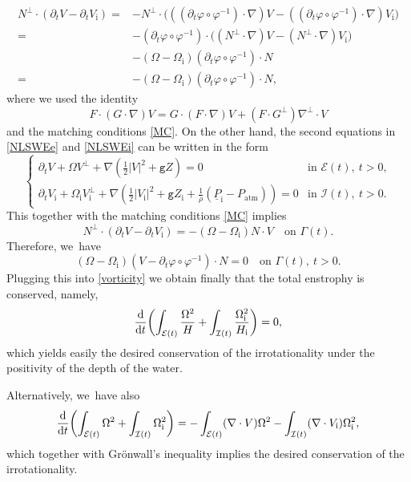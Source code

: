 \documentclass[JEP,XML,SOM,Unicode,NoFloatCountersInSection,published]{cedram}
\newcommand{\gr}{{\mathtt g}}
\newcommand{\dt}{\partial_t}
\newcommand{\cI}{{\mathcal I}}
\newcommand{\cE}{{\mathcal E}}
\newcommand{\ul}[1]{\underline{#1}}
\newcommand{\itGamma}{\mathit{\Gamma}}
\theoremstyle{definition}
\begin{document}
\begin{align*}
N^\perp\cdot(\dt V - \dt V_\mathrm{i})
=& -N^\perp\cdot\bigl(((\dt\varphi \circ \varphi^{-1})\cdot\nabla)V
- ((\dt\varphi \circ \varphi^{-1})\cdot\nabla)V_\mathrm{i} \bigr) \\
=& -(\dt\varphi \circ \varphi^{-1})\cdot\bigl((N^\perp\cdot\nabla)V - (N^\perp\cdot\nabla)V_\mathrm{i} \bigr)\\
& - (\Omega - \Omega_\mathrm{i})(\dt\varphi \circ \varphi^{-1}) \cdot N \\
=& - (\Omega - \Omega_\mathrm{i})(\dt\varphi \circ \varphi^{-1}) \cdot N,
\end{align*}
where we used the identity
\begin{equation}\label{F1}
F \cdot (G\cdot\nabla)V = G \cdot (F\cdot\nabla)V + (F\cdot G^\perp)\nabla^\perp \cdot V
\end{equation}
and the matching conditions \eqref{MC}.
On the other hand, the second equations in \eqref{NLSWEe} and \eqref{NLSWEi} can be written in the form
\[
\begin{cases}
\dt V + \Omega V^\perp + \nabla(\frac12|V|^2 + \gr Z) = 0 & \text{in } \cE(t), \ t>0, \\
\dt V_\mathrm{i} + \Omega_\mathrm{i} V_\mathrm{i}^\perp
+ \nabla(\frac12|V_\mathrm{i}|^2 + \gr Z_\mathrm{i} + \frac{1}{\rho}(\ul{P}_\mathrm{i}-P_\mathrm{atm})) = 0 & \text{in } \cI(t), \ t>0.
\end{cases}
\]
This together with the matching conditions \eqref{MC} implies
\[
N^\perp\cdot(\dt V - \dt V_\mathrm{i})=-(\Omega-\Omega_\mathrm{i})N\cdot V\quad\text{on }\itGamma(t).
\]
Therefore, we~have
\[
(\Omega - \Omega_\mathrm{i})(V - \dt\varphi \circ \varphi^{-1})\cdot N = 0 \quad\text{on } \itGamma(t), \ t>0.
\]
Plugging this into \eqref{vorticity} we obtain finally that the total enstrophy is conserved, namely,
\[
\frac{\rm d}{{\rm d}t}\biggl(\int_{\cE(t)}\frac{\Omega^2}{H} + \int_{\cI(t)}\frac{\Omega_\mathrm{i}^2}{H_\mathrm{i}} \biggr) = 0,
\]
which yields easily the desired conservation of the irrotationality under the positivity of the depth of the water.

Alternatively, we~have also
\[
\frac{\rm d}{{\rm d}t}\biggl(\int_{\cE(t)}\Omega^2 + \int_{\cI(t)}\Omega_\mathrm{i}^2\biggr)
= - \int_{\cE(t)}(\nabla\cdot V)\Omega^2 - \int_{\cI(t)}(\nabla\cdot V_\mathrm{i})\Omega_\mathrm{i}^2,
\]
which together with Grönwall's inequality implies the desired conservation of the irrotationality.
\end{document}
